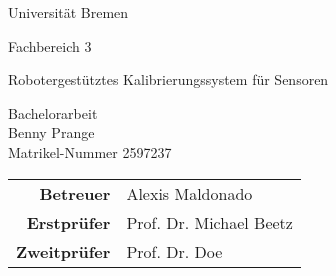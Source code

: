 
\pagestyle{empty} %

\clearscrheadings\clearscrplain
\begin{center}
\begin{Huge}
Universität Bremen\\
\vspace{3mm}
\end{Huge}
{\Large Fachbereich 3}\\

\vspace{20mm}
\begin{Large}
Robotergestütztes Kalibrierungssystem für Sensoren\\
\end{Large}
\vspace{8mm}
Bachelorarbeit\\
\vspace{0.4cm}
\vspace{2 cm}
Benny Prange \\
Matrikel-Nummer 2597237\\
\vspace{8cm}
\begin{tabular}{rl}
{\bfseries Betreuer} & Alexis Maldonado\\
{\bfseries Erstprüfer}&Prof. Dr. Michael Beetz\\
{\bfseries Zweitprüfer}&Prof. Dr. Doe\\
\end{tabular}

\end{center}
\clearpage


\pagestyle{useheadings} %

\tableofcontents %
\listoffigures %
\listoftables %
\clearpage










